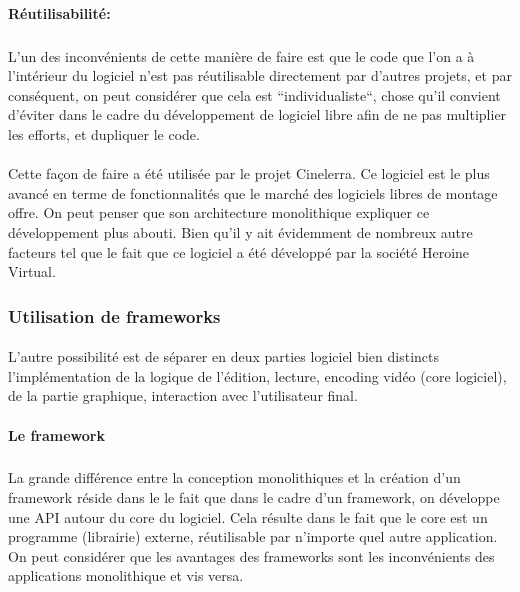 \paragraph{Réutilisabilité:}

\subparagraph { }

L'un des inconvénients de cette manière de faire est que le code que
l'on a à l'intérieur du logiciel n'est pas réutilisable directement
par d'autres projets, et par conséquent, on peut considérer que cela
est ``individualiste``, chose qu'il convient d'éviter dans le cadre du
développement de logiciel libre afin de ne pas multiplier les efforts,
et dupliquer le code.

\paragraph{}

Cette façon de faire a été utilisée par le projet Cinelerra. Ce
logiciel est le plus avancé en terme de fonctionnalités que le
marché des logiciels libres de montage offre. On peut penser que son
architecture monolithique expliquer ce développement
plus abouti. Bien qu'il y ait évidemment de nombreux autre facteurs
tel que le fait que ce logiciel a été développé par la société
Heroine Virtual.

\subsubsection {Utilisation de  frameworks }

\paragraph{} L'autre possibilité est de séparer en deux parties logiciel
bien distincts l'implémentation de la logique de l'édition, lecture,
encoding vidéo (core logiciel), de la partie graphique, interaction
avec l'utilisateur final.

\paragraph {Le framework}

\subparagraph{}

La grande différence entre la conception monolithiques
 et la création d'un framework 
réside dans le le fait que dans le cadre d'un framework, on développe
une API  autour du core du logiciel. Cela résulte dans le
fait que le core est un programme (librairie) externe, réutilisable par
n'importe quel autre application.  On peut considérer que les avantages
des frameworks sont les inconvénients des applications monolithique
 et vis versa.

